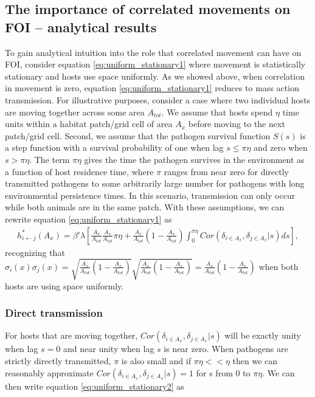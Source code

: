 \documentclass[letterpaper]{article}
\begin{document}
\subsection*{The importance of correlated movements on FOI -- analytical results}

To gain analytical intuition into the role that correlated movement can have on FOI, consider equation \ref{eq:uniform_stationary1} where movement is statistically stationary and hosts use space uniformly.  As we showed above, when correlation in movement is zero, equation \ref{eq:uniform_stationary1} reduces to mass action transmission. 
For illustrative purposes, consider a case where two individual hosts are moving together across some area $A_{tot}$. We assume that hosts spend $\eta$ time units within a habitat patch/grid cell of area $A_x$ before moving to the next patch/grid cell. Second, we assume that the pathogen survival function $S(s)$ is a step function with a survival probability of one when lag $s \leq \pi \eta$ and zero when $s > \pi \eta$.  
The term $\pi \eta$ gives the time the pathogen survives in the environment as a function of host residence time, where $\pi$ ranges from near zero for directly transmitted pathogens to some arbitrarily large number for pathogens with long environmental persistence times.  
In this scenario, transmission can only occur while both animals are in the same patch. With these assumptions, we can rewrite equation \ref{eq:uniform_stationary1} as 
\begin{equation}
    \begin{aligned}
        h^*_{i \leftarrow j}(A_x) = \beta' \lambda \left[\frac{A_x}{A_{tot}}\frac{A_x}{A_{tot}} \pi \eta + \frac{A_x}{A_{tot}}(1 - \frac{A_x}{A_{tot}}) \int_{0}^{\pi \eta} Cor(\delta_{i \in A_x}, \delta_{j \in A_x} | s) ds\right],
    \end{aligned}
    \label{eq:uniform_stationary2}
\end{equation}
recognizing that $\sigma_i(x) \sigma_j(x) = \sqrt{\frac{A_x}{A_{tot}}(1 - \frac{A_x}{A_{tot}})}\sqrt{\frac{A_x}{A_{tot}}(1 - \frac{A_x}{A_{tot}})} = \frac{A_x}{A_{tot}}(1 - \frac{A_x}{A_{tot}})$ when both hosts are using space uniformly.

\subsubsection*{Direct transmission}

For hosts that are moving together, $Cor(\delta_{i \in A_x}, \delta_{j \in A_x} | s)$ will be exactly unity when lag $s = 0$ and near unity when lag $s$ is near zero. When pathogens are strictly directly transmitted, $\pi$ is also small and if $\pi \eta << \eta$ then we can reasonably approximate $Cor(\delta_{i \in A_x}, \delta_{j \in A_x} | s) = 1$ for s from 0 to $\pi \eta$.  We can then write equation \ref{eq:uniform_stationary2} as 
\end{document}

